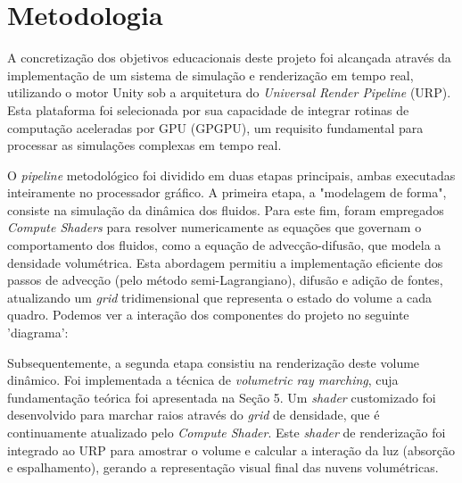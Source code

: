 \section{Metodologia}
\label{sec:metodologia}

A concretização dos objetivos educacionais deste projeto foi alcançada através da implementação de um sistema de simulação e renderização em tempo real, utilizando o motor Unity sob a arquitetura do \textit{Universal Render Pipeline} (URP). Esta plataforma foi selecionada por sua capacidade de integrar rotinas de computação aceleradas por GPU (GPGPU), um requisito fundamental para processar as simulações complexas em tempo real.

O \textit{pipeline} metodológico foi dividido em duas etapas principais, ambas executadas inteiramente no processador gráfico. A primeira etapa, a "modelagem de forma", consiste na simulação da dinâmica dos fluidos. Para este fim, foram empregados \textit{Compute Shaders} para resolver numericamente as equações que governam o comportamento dos fluidos, como a equação de advecção-difusão, que modela a densidade volumétrica. Esta abordagem permitiu a implementação eficiente dos passos de advecção (pelo método semi-Lagrangiano), difusão e adição de fontes, atualizando um \textit{grid} tridimensional que representa o estado do volume a cada quadro. Podemos ver a interação dos componentes do projeto no seguinte 'diagrama': 



Subsequentemente, a segunda etapa consistiu na renderização deste volume dinâmico. Foi implementada a técnica de \textit{volumetric ray marching}, cuja fundamentação teórica foi apresentada na Seção 5. Um \textit{shader} customizado foi desenvolvido para marchar raios através do \textit{grid} de densidade, que é continuamente atualizado pelo \textit{Compute Shader}. Este \textit{shader} de renderização foi integrado ao URP para amostrar o volume e calcular a interação da luz (absorção e espalhamento), gerando a representação visual final das nuvens volumétricas.


